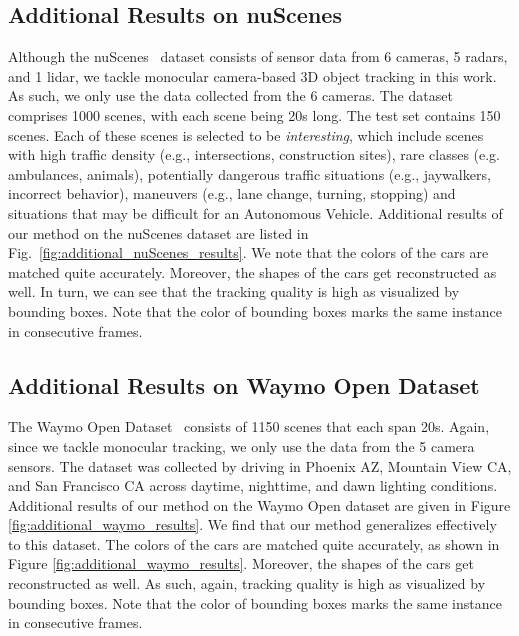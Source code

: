 \subsection{Additional Results on nuScenes} Although the nuScenes~\cite{caesar2020nuscenes} dataset consists of sensor data from 6 cameras, 5 radars, and 1 lidar, we tackle monocular camera-based 3D object tracking in this work. As such, we only use the data collected from the 6 cameras. The dataset comprises 1000 scenes, with each scene being 20s long. The test set contains 150 scenes. Each of these scenes is selected to be \textit{interesting}, which include scenes with high traffic density (e.g., intersections, construction sites), rare classes (e.g. ambulances, animals), potentially dangerous traffic situations (e.g., jaywalkers, incorrect behavior), maneuvers (e.g., lane change, turning, stopping) and situations that may be difficult for an Autonomous Vehicle. Additional results of our method on the nuScenes dataset are listed in Fig.~\ref{fig:additional_nuScenes_results}. We note that the colors of the cars are matched quite accurately.
Moreover, the shapes of the cars get reconstructed as well. In turn, we can see that the tracking quality is high as visualized by bounding boxes. Note that the color of bounding boxes marks the same instance in consecutive frames. 

\subsection{Additional Results on Waymo Open Dataset} The Waymo Open Dataset~\cite{sun2020scalability} consists of 1150 scenes that each span 20s. Again, since we tackle monocular tracking, we only use the data from the 5 camera sensors. The dataset was collected by driving in Phoenix AZ, Mountain View CA, and San Francisco CA across daytime, nighttime, and dawn lighting conditions. Additional results of our method on the Waymo Open dataset are given in Figure \ref{fig:additional_waymo_results}. We find that our method generalizes effectively to this dataset. The colors of the cars are matched quite accurately, as shown in Figure \ref{fig:additional_waymo_results}. Moreover, the shapes of the cars get reconstructed as well. As such, again, tracking quality is high as visualized by bounding boxes. Note that the color of bounding boxes marks the same instance in consecutive frames. 





